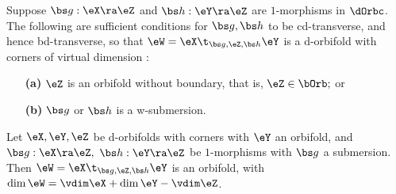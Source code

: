 \documentclass{article}
\begin{document}
\begin{thm} Suppose\/ $\bs g:\eX\ra\eZ$ and\/ $\bs h:\eY\ra\eZ$ are
$1$-morphisms in $\dOrbc$. The following are sufficient conditions
for $\bs g,\bs h$ to be cd-transverse, and hence bd-transverse, so
that\/ $\eW=\eX\t_{\bs g,\eZ,\bs h}\eY$ is a d-orbifold with corners
of virtual dimension\/ {\rm{}:}
\begin{itemize}
\setlength{\itemsep}{0pt}
\setlength{\parsep}{0pt}
\item[{\bf(a)}] $\eZ$ is an orbifold without boundary, that is,
$\eZ\in\bOrb;$ or
\item[{\bf(b)}] $\bs g$ or $\bs h$ is a w-submersion.
\end{itemize}
\label{ds14thm7}
\end{thm}

\begin{thm} Let\/ $\eX,\eY,\eZ$ be d-orbifolds with corners with\/
$\eY$ an orbifold, and\/ $\bs g:\eX\ra\eZ,$ $\bs h:\eY\ra\eZ$ be
$1$-morphisms with\/ $\bs g$ a submersion. Then\/ $\eW=\eX\t_{\bs g,\eZ,\bs h}\eY$ is an
orbifold,
with\/~$\dim\eW=\vdim\eX+\dim\eY-\vdim\eZ$.
\label{ds14thm8}
\end{thm}
\end{document}

